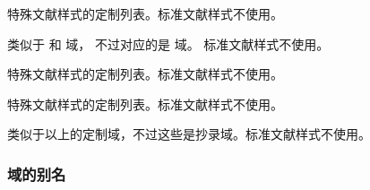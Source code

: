 \begin{fieldlist}




特殊文献样式的定制列表。标准文献样式不使用。




类似于  和  域，
不过对应的是  域。
标准文献样式不使用。




特殊文献样式的定制列表。标准文献样式不使用。




特殊文献样式的定制列表。标准文献样式不使用。




类似于以上的定制域，不过这些是抄录域。标准文献样式不使用。

\end{fieldlist}

\subsubsection{域的别名}%
\label{bib:fld:als}

